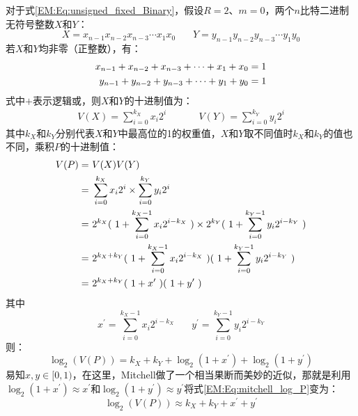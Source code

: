 对于式\eqref{EM:Eq:unsigned_fixed_Binary}，假设$R=2$、$m=0$，两个$n$比特二进制无符号整数$X$和$Y$：
\begin{equation}
    X = x_{n-1} x_{n-2} x_{n-3} \cdots x_1 x_0 \ \ \ \ \ \ \ \
    Y = y_{n-1} y_{n-2} y_{n-3} \cdots y_1 y_0 
\label{EM:Eq:mitchell_XY_binary}
\end{equation}
若$X$和$Y$均非零（正整数），有：
\begin{align}
    x_{n-1} + x_{n-2} + x_{n-3} + \cdots + x_1 + x_0 = 1 \notag \\
    y_{n-1} + y_{n-2} + y_{n-3} + \cdots + y_1 + y_0 = 1
\end{align}
式中$+$表示逻辑或，则$X$和$Y$的十进制值为：
\begin{align}
    V(X) = \sum_{i=0}^{k_X} x_i 2^i \ \ \ \ \ \ \ \ \ \ \ \ \ \ \ 
    V(Y) = \sum_{i=0}^{k_Y} y_i 2^i
\end{align}
其中$k_X$和$k_Y$分别代表$X$和$Y$中最高位的1的权重值\cite{AC:AM:TOSAM}，$X$和$Y$取不同值时$k_X$和$k_Y$的值也不同，乘积$P$的十进制值：
\begin{align}
    V(P) = & \ V(X)V(Y) \notag \\
    = & \ \sum_{i=0}^{k_X} x_i 2^i \times \sum_{i=0}^{k_Y} y_i 2^i \notag \\
    = & \ 2^{k_X} ( \ 1 + \sum_{i=0}^{k_X - 1} x_i 2^{i-k_X} \ ) \times 2^{k_Y} ( \ 1 + \sum_{i=0}^{k_Y - 1} y_i 2^{i-k_Y} \ ) \notag \\
    = & \ 2^{k_X + k_Y} ( \ 1 + \sum_{i=0}^{k_X - 1} x_i 2^{i-k_X} \ ) ( \ 1 +  \sum_{i=0}^{k_Y - 1} y_i 2^{i-k_Y}\ ) \notag \\
    = & \ 2^{k_X + k_Y} ( \ 1 + x^{\prime} \ ) ( \ 1 + y^{\prime} \ )
\label{EM:Eq:mitchell_P_orig}
\end{align}
其中
\begin{equation}
    x^{\prime} = \sum_{i=0}^{k_X - 1} x_i 2^{i-k_X} \ \ \ \ \ \ \ \
    y^{\prime} = \sum_{i=0}^{k_Y - 1} y_i 2^{i-k_Y}
\end{equation}
则：
\begin{equation}
    \log_2 (V(P)) = k_X + k_Y + \log_2 (1+x^{\prime}) + \log_2 (1+y^{\prime})
\label{EM:Eq:mitchell_log_P}
\end{equation}
易知$x, y \in [0,1)$，在这里，Mitchell做了一个相当果断而美妙的近似，那就是利用$\log_2 (1+x^{\prime}) \approx x^{\prime}$和$\log_2 (1+y^{\prime}) \approx y^{\prime}$将式\eqref{EM:Eq:mitchell_log_P}变为：
\begin{equation}
    \log_2 (V(P)) \approx k_X + k_Y + x^{\prime} + y^{\prime}
\label{EM:Eq:mitchell_log_P_2}
\end{equation}
